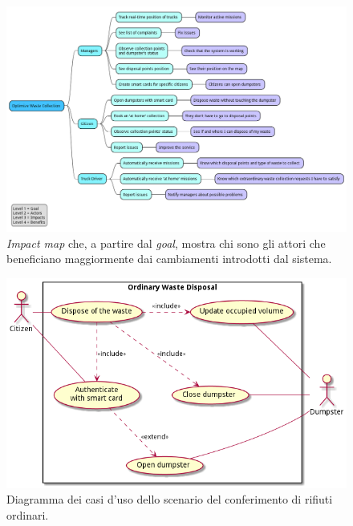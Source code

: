 \begin{figure}[H]
    \centering
    \includegraphics[width=\textwidth]{uml/benefit-mapping.pm}
    \caption{\textit{Impact map} che, a partire dal \textit{goal}, mostra chi sono gli attori che beneficiano maggiormente dai cambiamenti introdotti dal sistema.}
    \label{fig:uml/benefit-mapping}
\end{figure}


\begin{figure}[H]
    \centering
    \includegraphics[width=\textwidth]{uml/ordinary-disposal-use-cases.pm}
    \caption{Diagramma dei casi d'uso dello scenario del conferimento di rifiuti ordinari.}
    \label{fig:uml/ordinary-disposal-use-cases}
\end{figure}


